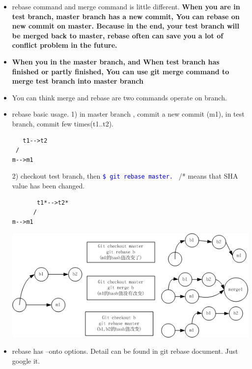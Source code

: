 \documentclass[a4paper,12pt,twoside]{book}
\newcommand{\linuxcommand}[1]{\texttt{\textcolor{blue}{\$ #1 \Pisymbol{psy}{191}}}}
\begin{document}
\begin{itemize}
\begin{itemize}
\begin{itemize}
\item rebase command and merge command is little different. \textbf{When you are in test branch, master branch has a new commit, You can rebase on new commit on master. Because in the end, your test branch will be merged back to master, rebase often can save you a lot of conflict problem in the future. }

\item \textbf{When you in the master branch, and When test branch has finished or partly finished, You can use git merge command to merge test branch into master branch}

\item You can think merge and rebase are two commands operate on branch.

\item rebase basic usage.
1) in master  branch , commit a new commit (m1), in test branch, commit few times(t1..t2). \\
\begin{verbatim}
   t1-->t2
 /
m-->m1
\end{verbatim}
2) checkout test branch, then \linuxcommand{git rebase master.} /* means that SHA value has been changed.\\
\begin{verbatim}
       t1*-->t2*
      /
m-->m1
\end{verbatim}

\includegraphics[scale=0.7]{pics/Git_rebase} \\

\item rebase has --onto options. Detail can be found in git rebase document. Just google it. 




\end{itemize}
\end{itemize}
\end{itemize}
\end{document}
